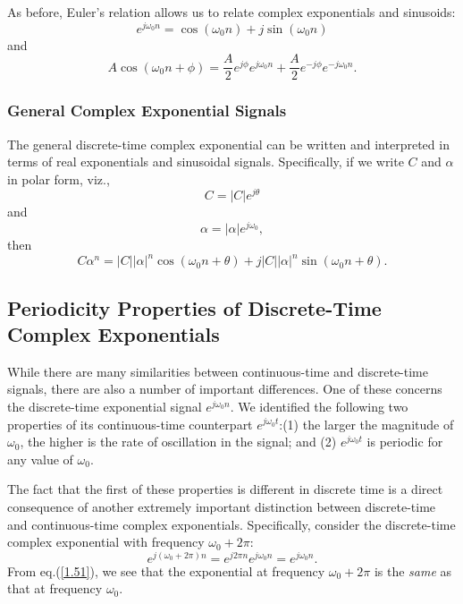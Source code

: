 \documentclass[a4paper,twoside]{book}
\begin{document}
As before, Euler's relation allows us to relate complex exponentials and sinusoids:
\begin{equation}
    e^{j\omega_0n}=\cos(\omega_0n)+j\sin(\omega_0n)
    \label{1.48}
\end{equation}
and
\begin{equation}
    A\cos(\omega_{0}n+\phi) = \frac{A}{2}e^{j\phi}e^{j\omega_{0}n} + \frac{A}{2}e^{-j\phi}e^{-j\omega_{0}n}.
    \label{1.49}
\end{equation}

\subsubsection{General Complex Exponential Signals}

The general discrete-time complex exponential can be written and interpreted in terms of real exponentials and sinusoidal signals. Specifically, if we write $C$ and $\alpha$ in polar form, viz., $$C=|C|e^{j\theta}$$ and $$\alpha=|\alpha|e^{j\omega_0},$$ then
\begin{equation}
    C\alpha^{n}=|C||\alpha|^{n}\cos(\omega_{0}n+\theta)+j|C||\alpha|^{n}\sin(\omega_{0}n+\theta).
    \label{1.50}
\end{equation}

\subsection{Periodicity Properties of Discrete-Time Complex Exponentials}
\label{section:1.3.3}

While there are many similarities between continuous-time and discrete-time signals, there are also a number of important differences. One of these concerns the discrete-time exponential signal $e^{j\omega_0n}$. We identified the following two properties of its continuous-time counterpart $e^{j\omega_0t}$:(1) the larger the magnitude of $\omega_0$, the higher is the rate of oscillation in the signal; and (2) $e^{j\omega_0t}$ is periodic for any value of $\omega_0$.

The fact that the first of these properties is different in discrete time is a direct consequence of another extremely important distinction between discrete-time and continuous-time complex exponentials. Specifically, consider the discrete-time complex exponential with frequency $\omega_0+2\pi$:
\begin{equation}
    e^{j(\omega_0+2\pi)n} = e^{j2\pi n}e^{j\omega_0n} = e^{j\omega_0n}.
    \label{1.51}
\end{equation}
From eq.\;(\ref{1.51}), we see that the exponential at frequency $\omega_0+2\pi$ is the \textit{same} as that at frequency $\omega_0$.
\end{document}
